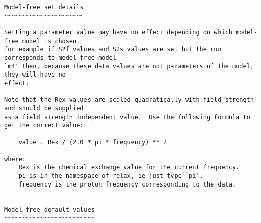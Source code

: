 {\begin{verbatim}
Model-free set details
~~~~~~~~~~~~~~~~~~~~~~

Setting a parameter value may have no effect depending on which model-free model is chosen,
for example if S2f values and S2s values are set but the run corresponds to model-free model
`m4' then, because these data values are not parameters of the model, they will have no
effect.

Note that the Rex values are scaled quadratically with field strength and should be supplied
as a field strength independent value.  Use the following formula to get the correct value:

    value = Rex / (2.0 * pi * frequency) ** 2

where:
    Rex is the chemical exchange value for the current frequency.
    pi is in the namespace of relax, ie just type `pi'.
    frequency is the proton frequency corresponding to the data.


Model-free default values
~~~~~~~~~~~~~~~~~~~~~~~~~


\end{verbatim}}
